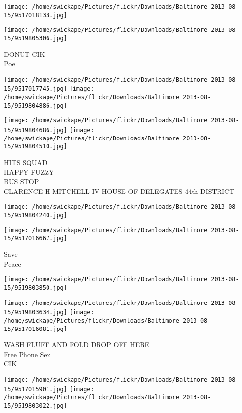 \documentclass[10pt,letterpaper]{article}
\begin{document}
\texttt{[image: /home/swickape/Pictures/flickr/Downloads/Baltimore 2013-08-15/9517018133.jpg]}

\vspace{0.25in}
\texttt{[image: /home/swickape/Pictures/flickr/Downloads/Baltimore 2013-08-15/9519805306.jpg]}

DONUT CIK\\
Poe
\pagebreak

\texttt{[image: /home/swickape/Pictures/flickr/Downloads/Baltimore 2013-08-15/9517017745.jpg]}
\texttt{[image: /home/swickape/Pictures/flickr/Downloads/Baltimore 2013-08-15/9519804886.jpg]}

\texttt{[image: /home/swickape/Pictures/flickr/Downloads/Baltimore 2013-08-15/9519804686.jpg]}
\texttt{[image: /home/swickape/Pictures/flickr/Downloads/Baltimore 2013-08-15/9519804510.jpg]}

HITS SQUAD\\
HAPPY FUZZY\\
BUS STOP\\
CLARENCE H MITCHELL IV HOUSE OF DELEGATES 44th DISTRICT
\pagebreak

\texttt{[image: /home/swickape/Pictures/flickr/Downloads/Baltimore 2013-08-15/9519804240.jpg]}

\vspace{0.25in}
\texttt{[image: /home/swickape/Pictures/flickr/Downloads/Baltimore 2013-08-15/9517016667.jpg]}

Save\\
Peace
\pagebreak

\texttt{[image: /home/swickape/Pictures/flickr/Downloads/Baltimore 2013-08-15/9519803850.jpg]}

\vspace{0.25in}
\texttt{[image: /home/swickape/Pictures/flickr/Downloads/Baltimore 2013-08-15/9519803634.jpg]}
\texttt{[image: /home/swickape/Pictures/flickr/Downloads/Baltimore 2013-08-15/9517016081.jpg]}

WASH FLUFF AND FOLD DROP OFF HERE\\
Free Phone Sex\\
CIK
\pagebreak

\texttt{[image: /home/swickape/Pictures/flickr/Downloads/Baltimore 2013-08-15/9517015901.jpg]}
\texttt{[image: /home/swickape/Pictures/flickr/Downloads/Baltimore 2013-08-15/9519803022.jpg]}
\end{document}
